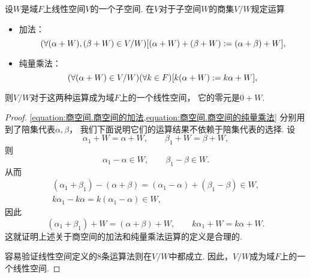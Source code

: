 \begin{theorem}\label{theorem:商空间.商空间的线性运算}
设\(W\)是域\(F\)上线性空间\(V\)的一个子空间.
在\(V\)对于子空间\(W\)的商集\(V/W\)规定运算\begin{itemize}
	\item 加法：\begin{equation}\label{equation:商空间.商空间的加法}
		(\forall(\alpha+W),(\beta+W)\in V/W)[(\alpha+W) + (\beta+W) := (\alpha+\beta)+W],
	\end{equation}
	\item 纯量乘法：\begin{equation}\label{equation:商空间.商空间的纯量乘法}
		(\forall(\alpha+W)\in V/W)(\forall k \in F)[k(\alpha+W) := k\alpha+W],
	\end{equation}
\end{itemize}
则\(V/W\)对于这两种运算成为域\(F\)上的一个线性空间，
它的零元是\(0+W\).
\begin{proof}
\cref{equation:商空间.商空间的加法,equation:商空间.商空间的纯量乘法}
分别用到了陪集代表\(\alpha,\beta\)，
我们下面说明它们的运算结果不依赖于陪集代表的选择.
设\begin{equation*}
	\alpha_1 + W = \alpha + W,
	\qquad
	\beta_1 + W = \beta + W,
\end{equation*}
则\begin{equation*}
	\alpha_1 - \alpha \in W,
	\qquad
	\beta_1 - \beta \in W.
\end{equation*}
从而\begin{gather*}
	(\alpha_1 + \beta_1) - (\alpha + \beta)
	= (\alpha_1 - \alpha) + (\beta_1 - \beta)
	\in W, \\
	k \alpha_1 - k \alpha
	= k (\alpha_1 - \alpha)
	\in W,
\end{gather*}
因此\begin{equation*}
	(\alpha_1 + \beta_1) + W
	= (\alpha + \beta) + W,
	\qquad
	k \alpha_1 + W
	= k \alpha + W.
\end{equation*}
这就证明上述关于商空间的加法和纯量乘法运算的定义是合理的.

容易验证线性空间定义的8条运算法则在\(V/W\)中都成立.
因此，\(V/W\)成为域\(F\)上的一个线性空间.
\end{proof}
\end{theorem}

